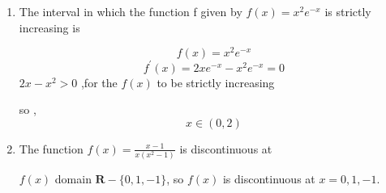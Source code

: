 \begin{enumerate}[label=\thesubsection.\arabic*, ref=\thesubsection.\theenumi]
\begin{enumerate}
\end{enumerate}
\solution 
\begin{align}
    cos^{-1}x + sin^{-1}x = \frac{\pi}{2}
\end{align}
$cos(\frac{\pi}{2})= 0$ so,
$$cos^{-1}\frac{2}{\sqrt{5}} + sin^{-1}x = \frac{\pi}{2}$$
$$ x= \frac{2}{\sqrt{5}}$$.


\item

The interval in which the function f given by $f(x)=x^{2}e^{-x}$ is strictly increasing is
\begin{enumerate}
    
\end{enumerate}

\solution 
$$f(x) = x^2e^{-x}$$
$$f^\prime(x) =2xe^{-x} - x^2e^{-x} =0 $$
$2x-x^2 >0$ ,for the $f(x)$ to be strictly increasing

so ,$$x\in (0,2)$$

\item 
The function $f(x)=\frac{x-1}{x(x^{2}-1)}$ is discontinuous at
\begin{enumerate}
\end{enumerate}
\solution 

$f(x) $ domain $\mathbf{R}-\{0,1,-1\}$, so $f(x)$ is discontinuous at $x= 0,1,-1$.


\end{enumerate}
